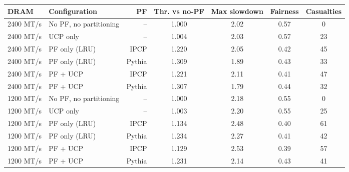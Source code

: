 \begin{tabular}{llrcccc}
\toprule
DRAM & Configuration & PF & Thr. vs no-PF & Max slowdown & Fairness & Casualties \\
\midrule
2400 MT/s & No PF, no partitioning & -- & 1.000 & 2.02 & 0.57 & 0 \\
2400 MT/s & UCP only & -- & 1.004 & 2.03 & 0.57 & 23 \\
2400 MT/s & PF only (LRU) & IPCP & 1.220 & 2.05 & 0.42 & 45 \\
2400 MT/s & PF only (LRU) & Pythia & 1.309 & 1.89 & 0.43 & 33 \\
2400 MT/s & PF + UCP & IPCP & 1.221 & 2.11 & 0.41 & 47 \\
2400 MT/s & PF + UCP & Pythia & 1.307 & 1.79 & 0.44 & 32 \\
\midrule
1200 MT/s & No PF, no partitioning & -- & 1.000 & 2.18 & 0.55 & 0 \\
1200 MT/s & UCP only & -- & 1.003 & 2.20 & 0.55 & 25 \\
1200 MT/s & PF only (LRU) & IPCP & 1.134 & 2.48 & 0.40 & 61 \\
1200 MT/s & PF only (LRU) & Pythia & 1.234 & 2.27 & 0.41 & 42 \\
1200 MT/s & PF + UCP & IPCP & 1.129 & 2.53 & 0.39 & 57 \\
1200 MT/s & PF + UCP & Pythia & 1.231 & 2.14 & 0.43 & 41 \\
\bottomrule
\end{tabular}
